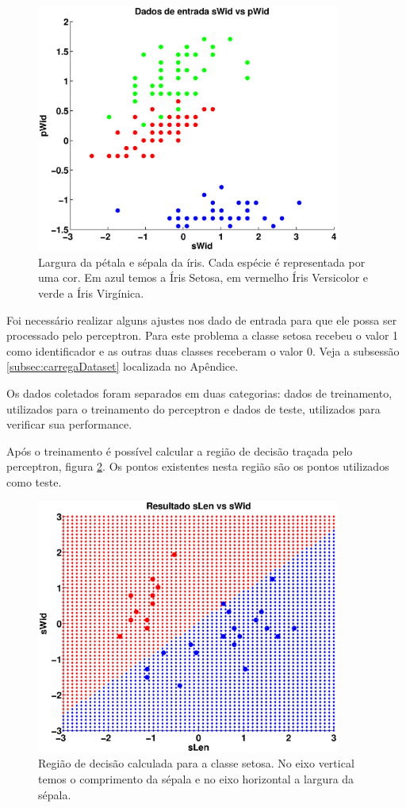 \documentclass[12pt,journal,onecolumn]{IEEEtran}
\begin{document}
\begin{figure}[!htbp]
	\centering
	\includegraphics[width=10cm]
	{eps/3classes/input/sWid-vs-pWid.eps}
	\caption{Largura da pétala e sépala da íris. Cada espécie é
	representada por uma cor. Em azul temos a Íris Setosa, em vermelho
	Íris Versicolor e verde a Íris Virgínica.}
	\label{fig:irisDataset} 
\end{figure}

Foi necessário realizar alguns ajustes nos dado de entrada para que ele possa
ser processado pelo perceptron. Para este problema a classe setosa recebeu o
valor 1 como identificador e as outras duas classes receberam o valor 0. Veja a
subsessão \ref{subsec:carregaDataset} localizada no Apêndice.

Os dados coletados foram separados em duas categorias: dados de
treinamento, utilizados para o treinamento do perceptron e dados de teste,
utilizados para verificar sua performance.

Após o treinamento é possível calcular a região de decisão traçada pelo
perceptron, figura \ref{fig:decSetosa}. Os pontos existentes nesta região são os
pontos utilizados como teste. 
 
\begin{figure}[!htbp]
	\centering
	\includegraphics[width=10cm]
	{eps/setosa/regiao/sLen-vs-sWid.eps}
	\caption{Região de decisão calculada para a classe setosa. No eixo vertical
	temos o comprimento da sépala e no eixo horizontal a largura da sépala.}
	\label{fig:decSetosa}
\end{figure} 
\end{document}
